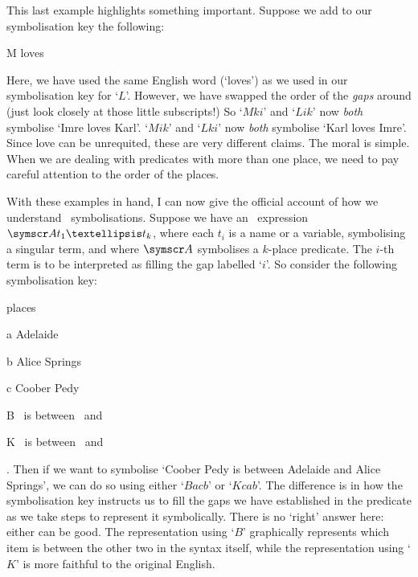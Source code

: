 This last example highlights something important. Suppose we add to our symbolisation key the following:
	\begin{ekey}
		\item[M]  loves 
	\end{ekey}
Here, we have used the same English word (`loves') as we used in our symbolisation key for `$L$'. However, we have swapped the order of the \emph{gaps} around (just look closely at those little subscripts!) So `$Mki$' and `$Lik$' now \emph{both} symbolise `Imre loves Karl'. `$Mik$' and `$Lki$' now \emph{both} symbolise `Karl loves Imre'. Since love can be unrequited, these are very different claims. The moral is simple. When we are dealing with predicates with more than one place, we need to pay careful attention to the order of the places. 

With these examples in hand, I can now give the official account of how we understand \FOL\ symbolisations. Suppose we have an \FOL\ expression $\meta{A}t_{1}…t_{k}$, where each $t_{i}$ is a name or a variable, symbolising a singular term, and where $\meta{A}$ symbolises a $k$-place predicate. The $i$-th term is to be interpreted as filling the gap labelled `$i$'. So consider the following symbolisation key: \begin{ekey}
	\item[\domain] places
		\item[a] Adelaide
		\item[b] Alice Springs
		\item[c] Coober Pedy
		\item[B] \ is between \ and \gap{3}
		\item[K] \ is between \ and \gap{3}
\end{ekey}. Then if we want to symbolise `Coober Pedy is between Adelaide and Alice Springs', we can do so using either `$Bacb$' or `$Kcab$'. The difference is in how the symbolisation key instructs us to fill the gaps we have established in the predicate as we take steps to represent it symbolically. There is no `right' answer here: either can be good. The representation using `$B$' graphically represents which item is between the other two in the syntax itself, while the representation using `$K$' is more faithful to the original English.


